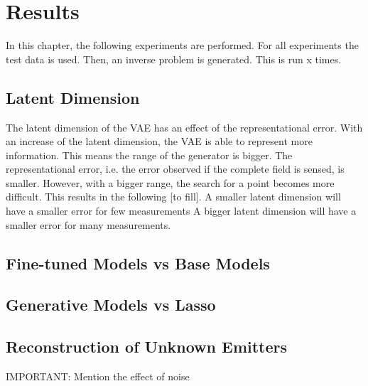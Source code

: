 
\chapter{Results}\label{chapter:results}
In this chapter, the following experiments are performed.
For all experiments the test data is used.
Then, an inverse problem is generated.
This is run x times.

\section{Latent Dimension}
The latent dimension of the VAE has an effect of the representational error.
With an increase of the latent dimension, the VAE is able to represent more information.
This means the range of the generator is bigger.
The representational error, i.e. the error observed if the complete field is sensed, is smaller.
However, with a bigger range, the search for a point becomes more difficult.
This results in the following [to fill].
A smaller latent dimension will have a smaller error for few measurements
A bigger latent dimension will have a smaller error for many measurements.

\section{Fine-tuned Models vs Base Models}
\section{Generative Models vs Lasso}
\section{Reconstruction of Unknown Emitters}

IMPORTANT:
Mention the effect of noise